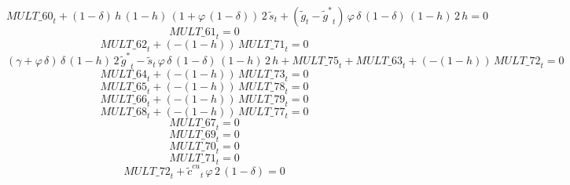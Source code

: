 \begin{dmath}
{MULT\_60}_{t}+\left(1-{{\delta}}\right)\, {{h}}\, \left(1-{{h}}\right)\, \left(1+{{\varphi}}\, \left(1-{{\delta}}\right)\right)\, 2\, {{\tilde s}}_{t}+\left({{\tilde g}}_{t}-{{\tilde g^*}}_{t}\right)\, {{\varphi}}\, {{\delta}}\, \left(1-{{\delta}}\right)\, \left(1-{{h}}\right)\, 2\, {{h}}=0
\end{dmath}
\begin{dmath}
{MULT\_61}_{t}=0
\end{dmath}
\begin{dmath}
{MULT\_62}_{t}+\left(-\left(1-{{h}}\right)\right)\, {MULT\_71}_{t}=0
\end{dmath}
\begin{dmath}
\left({{\gamma}}+{{\varphi}}\, {{\delta}}\right)\, {{\delta}}\, \left(1-{{h}}\right)\, 2\, {{\tilde g^*}}_{t}-{{\tilde s}}_{t}\, {{\varphi}}\, {{\delta}}\, \left(1-{{\delta}}\right)\, \left(1-{{h}}\right)\, 2\, {{h}}+{MULT\_75}_{t}+{MULT\_63}_{t}+\left(-\left(1-{{h}}\right)\right)\, {MULT\_72}_{t}=0
\end{dmath}
\begin{dmath}
{MULT\_64}_{t}+\left(-\left(1-{{h}}\right)\right)\, {MULT\_73}_{t}=0
\end{dmath}
\begin{dmath}
{MULT\_65}_{t}+\left(-\left(1-{{h}}\right)\right)\, {MULT\_78}_{t}=0
\end{dmath}
\begin{dmath}
{MULT\_66}_{t}+\left(-\left(1-{{h}}\right)\right)\, {MULT\_79}_{t}=0
\end{dmath}
\begin{dmath}
{MULT\_68}_{t}+\left(-\left(1-{{h}}\right)\right)\, {MULT\_77}_{t}=0
\end{dmath}
\begin{dmath}
{MULT\_67}_{t}=0
\end{dmath}
\begin{dmath}
{MULT\_69}_{t}=0
\end{dmath}
\begin{dmath}
{MULT\_70}_{t}=0
\end{dmath}
\begin{dmath}
{MULT\_71}_{t}=0
\end{dmath}
\begin{dmath}
{MULT\_72}_{t}+{{\tilde c^{cu}}}_{t}\, {{\varphi}}\, 2\, \left(1-{{\delta}}\right)=0
\end{dmath}
